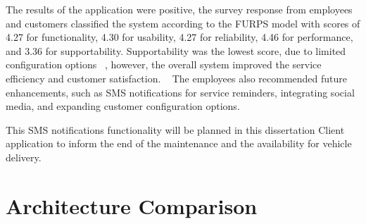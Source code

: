 The results of the application were positive, the survey response from employees and customers classified the system according to the \ac{FURPS} model with scores of 4.27 for functionality, 4.30 for usability, 4.27 for reliability, 4.46 for performance, and 3.36 for supportability.
Supportability was the lowest score, due to limited configuration options ~\cite{MAS_MOTORS}, however, the overall system improved the service efficiency and customer satisfaction. ~\cite{MAS_MOTORS}
The employees also recommended future enhancements, such as SMS notifications for service reminders, integrating social media, and expanding customer configuration options.

This SMS notifications functionality will be planned in this dissertation Client application to inform the end of the maintenance and the availability for vehicle delivery.  


\section{Architecture Comparison}




